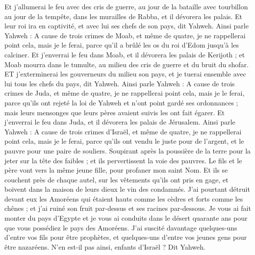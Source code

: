 \begin{multicols}{2}
Et j'allumerai le feu avec des cris de guerre, au jour de la bataille avec tourbillon au jour de la tempête, dans les murailles de Rabba, et il dévorera les palais. 
Et leur roi ira en captivité, et avec lui ses chefs de son pays, dit Yahweh.
\VerseOne{}Ainsi parle Yahweh : A cause de trois crimes de Moab, et même de quatre, je ne rappellerai point cela, mais je le ferai, parce qu'il a brûlé les os du roi d'Edom jusqu'à les calciner.
Et j'enverrai le feu dans Moab, et il dévorera les palais de Kerijoth ; et Moab mourra dans le tumulte, au milieu des cris de guerre et du bruit du shofar.
ET j'exterminerai les gouverneurs du milieu son pays, et je tuerai ensemble avec lui tous les chefs du pays, dit Yahweh.
Ainsi parle Yahweh : A cause de trois crimes de Juda, et même de quatre, je ne rappellerai point cela, mais je le ferai, parce qu'ils ont rejeté la loi de Yahweh et n'ont point gardé ses ordonnances ; mais leurs mensonges que leurs pères avaient suivis les ont fait égarer.  
Et j'enverrai le feu dans Juda, et il dévorera les palais de Jérusalem.
Ainsi parle Yahweh : A cause de trois crimes d'Israël, et même de quatre, je ne rappellerai point cela, mais je le ferai, parce qu'ils ont vendu le juste pour de l'argent, et le pauvre pour une paire de souliers.
Soupirant après la poussière de la terre pour la jeter sur la tête des faibles ; et ils pervertissent la voie des pauvres. Le fils et le père vont vers la même jeune fille, pour profaner mon saint Nom.
Et ils se couchent près de chaque autel, sur les vêtements qu'ils ont pris en gage, et boivent dans la maison de leurs dieux le vin des condamnés.
J'ai pourtant détruit devant eux les Amoréens qui étaient hauts comme les cèdres et forts comme les chênes ; et j'ai ruiné  son fruit par-dessus et ses racines par-dessous.
Je vous ai fait monter du pays d'Egypte et je vous ai conduits dans le désert quarante ans pour que vous possédiez le pays des Amoréens.
J'ai suscité davantage quelques-uns d'entre vos fils pour être prophètes, et quelques-uns d'entre vos jeunes gens pour être nazaréens. N'en est-il pas ainsi, enfants d'Israël ? Dit Yahweh.

\end{multicols}
